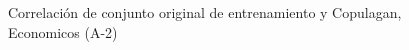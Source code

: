 \begin{figure}[H]
    \centering
    
    \caption{Correlación de conjunto original de entrenamiento y Copulagan, Economicos (A-2)}
    \label{pairwise-economicos-a-2-copulagan}
\end{figure}